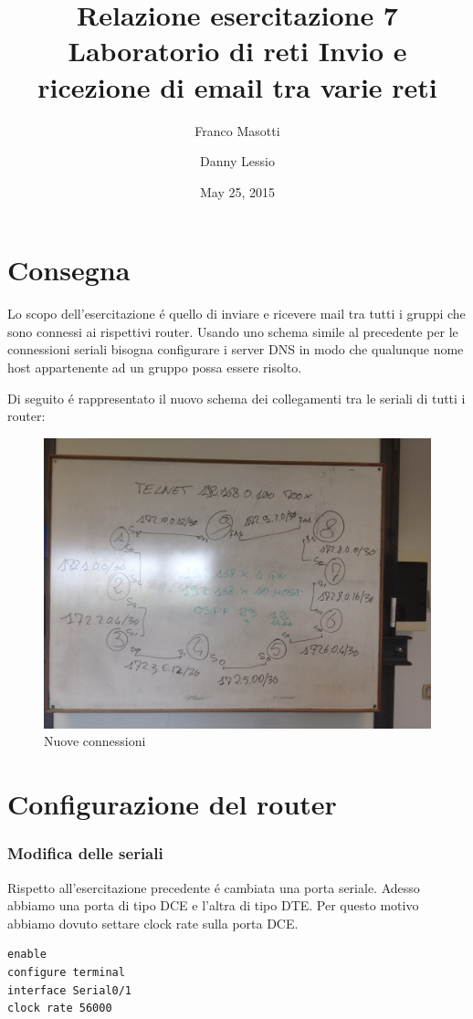 \documentclass[9pt, a4paper, oneside]{article}
\title{Relazione esercitazione 7 Laboratorio di reti\newline
Invio e ricezione di email tra varie reti}
\author{Franco Masotti \and Danny Lessio}
\date{May 25, 2015}
\begin{document}
	\maketitle
	\tableofcontents
	\newpage
	\part{Consegna}
			\par
				Lo scopo dell'esercitazione \'e quello di 
				inviare e ricevere mail tra tutti i gruppi che 
				sono connessi ai rispettivi router. Usando uno 
				schema simile al precedente per le 
				connessioni seriali bisogna configurare i 
				server DNS in modo che qualunque nome host 
				appartenente ad un gruppo possa essere 
				risolto. 
			\par
				Di seguito \'e rappresentato il nuovo schema 
				dei collegamenti tra le seriali di tutti i router:
				\begin{figure}[H]
					\centering
					\caption{Nuove connessioni}
					\includegraphics[scale=0.12]{../source/schema_connessioni.jpg}
				\end{figure}
		\newpage
	\part{Configurazione del router}
		\section{Modifica delle seriali}
			\par
				Rispetto all'esercitazione precedente \'e 
				cambiata una porta seriale. Adesso abbiamo 
				una porta di tipo DCE e l'altra di tipo DTE. 
				Per questo motivo abbiamo dovuto settare clock 
				rate sulla porta DCE.
				\begin{verbatim}
enable
configure terminal
interface Serial0/1
clock rate 56000
				\end{verbatim}
\end{document}
